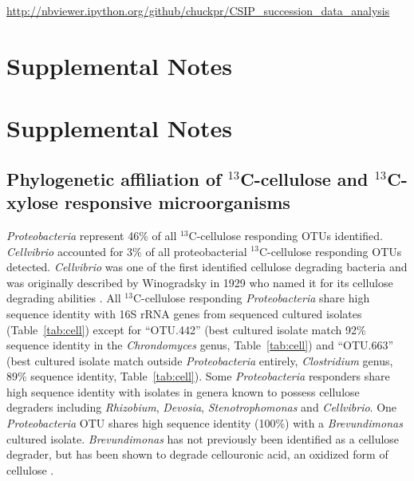 \url{http://nbviewer.ipython.org/github/chuckpr/CSIP_succession_data_analysis}\section{Supplemental Notes}

\section{Supplemental Notes}
\subsection{Phylogenetic affiliation of $^{13}$C-cellulose and
    $^{13}$C-xylose responsive microorganisms}
\textit{Proteobacteria} represent 46\% of all $^{13}$C-cellulose responding
OTUs identified. \textit{Cellvibrio} accounted for 3\% of all proteobacterial
$^{13}$C-cellulose responding OTUs detected. \textit{Cellvibrio} was one of the
first identified cellulose degrading bacteria and was originally described by
Winogradsky in 1929 who named it for its cellulose degrading abilities
\citep{boone2001bergeys}. All $^{13}$C-cellulose responding
\textit{Proteobacteria} share high sequence identity with 16S rRNA genes from
sequenced cultured isolates (Table~\ref{tab:cell}) except for ``OTU.442'' (best
cultured isolate match 92\% sequence identity in the \textit{Chrondomyces}
genus, Table~\ref{tab:cell}) and ``OTU.663'' (best cultured isolate match
outside \textit{Proteobacteria} entirely, \textit{Clostridium} genus, 89\%
sequence identity, Table~\ref{tab:cell}). Some \textit{Proteobacteria}
responders share high sequence identity with isolates in genera known to
possess cellulose degraders including \textit{Rhizobium}, \textit{Devosia},
\textit{Stenotrophomonas} and \textit{Cellvibrio}. One \textit{Proteobacteria}
OTU shares high sequence identity (100\%) with a \textit{Brevundimonas} cultured
isolate.  \textit{Brevundimonas} has not previously been identified as a
cellulose degrader, but has been shown to degrade cellouronic acid, an oxidized
form of cellulose \citep{Tavernier_2008}.

